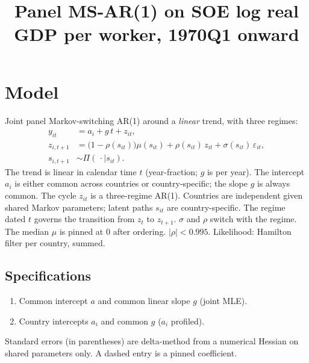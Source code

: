 \documentclass[11pt]{article}
\title{Panel MS-AR(1) on SOE log real GDP per worker, 1970Q1 onward}
\author{}
\date{}
\begin{document}
\maketitle
\section{Model}
Joint panel Markov-switching AR(1) around a \emph{linear} trend, with three regimes:
\begin{align}
y_{it} &= a_i + g\, t + z_{it}, \\
z_{i,t+1} &= \bigl(1-\rho(s_{it})\bigr)\mu(s_{it}) + \rho(s_{it})\, z_{it} + \sigma(s_{it})\,\varepsilon_{it}, \\
s_{i,t+1} &\sim \Pi(\,\cdot\mid s_{it}).
\end{align}
The trend is linear in calendar time $t$ (year-fraction; $g$ is per year). The intercept $a_i$ is either common across countries or country-specific; the slope $g$ is always common. The cycle $z_{it}$ is a three-regime AR(1). Countries are independent given shared Markov parameters; latent paths $s_{it}$ are country-specific. The regime dated $t$ governs the transition from $z_t$ to $z_{t+1}$. $\sigma$ and $\rho$ switch with the regime. The median $\mu$ is pinned at 0 after ordering. $|\rho|<0.995$. Likelihood: Hamilton filter per country, summed.
\subsection*{Specifications}
\begin{enumerate}
\item Common intercept $a$ and common linear slope $g$ (joint MLE).
\item Country intercepts $a_i$ and common $g$ ($a_i$ profiled).
\end{enumerate}
Standard errors (in parentheses) are delta-method from a numerical Hessian on shared parameters only. A dashed entry is a pinned coefficient.
\clearpage
\end{document}
